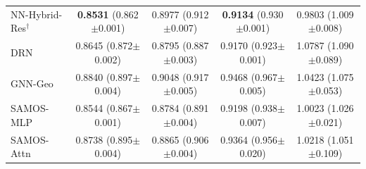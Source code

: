 \begin{table}[!htbp]
{\begin{tabular}{lcccc}
NN-Hybrid-Res$^\dagger$ & \textbf{0.8531} {\scriptsize (0.862$\pm$0.001)} & 0.8977 {\scriptsize (0.912$\pm$0.007)} & \textbf{0.9134} {\scriptsize (0.930$\pm$0.001)} & 0.9803 {\scriptsize (1.009$\pm$0.008)} \\
\addlinespace
DRN & 0.8645 {\scriptsize (0.872$\pm$0.002)} & 0.8795 {\scriptsize (0.887$\pm$0.003)} & 0.9170 {\scriptsize (0.923$\pm$0.001)} & 1.0787 {\scriptsize (1.090$\pm$0.089)} \\
GNN-Geo & 0.8840 {\scriptsize (0.897$\pm$0.004)} & 0.9048 {\scriptsize (0.917$\pm$0.005)} & 0.9468 {\scriptsize (0.967$\pm$0.005)} & 1.0423 {\scriptsize (1.075$\pm$0.053)} \\
\addlinespace
SAMOS-MLP & 0.8544 {\scriptsize (0.867$\pm$0.001)} & 0.8784 {\scriptsize (0.891$\pm$0.004)} & 0.9198 {\scriptsize (0.938$\pm$0.007)} & 1.0023 {\scriptsize (1.026$\pm$0.021)} \\
SAMOS-Attn & 0.8738 {\scriptsize (0.895$\pm$0.004)} & 0.8865 {\scriptsize (0.906$\pm$0.004)} & 0.9364 {\scriptsize (0.956$\pm$0.020)} & 1.0218 {\scriptsize (1.051$\pm$0.109)} \\
\bottomrule
\end{tabular}}
\end{table}
